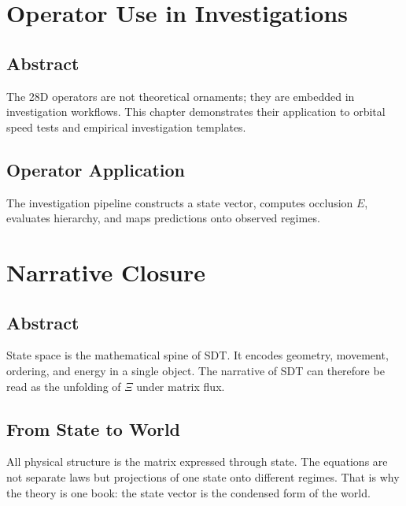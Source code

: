 \documentclass[12pt]{book}
\begin{document}
\chapter{Operator Use in Investigations}

\section*{Abstract}
The 28D operators are not theoretical ornaments; they are embedded in investigation workflows. This
chapter demonstrates their application to orbital speed tests and empirical investigation templates.

\section{Operator Application}
The investigation pipeline constructs a state vector, computes occlusion $E$, evaluates hierarchy, and
maps predictions onto observed regimes.

\chapter{Narrative Closure}

\section*{Abstract}
State space is the mathematical spine of SDT. It encodes geometry, movement, ordering, and energy in a
single object. The narrative of SDT can therefore be read as the unfolding of $\Xi$ under matrix flux.

\section{From State to World}
All physical structure is the matrix expressed through state. The equations are not separate laws but
projections of one state onto different regimes. That is why the theory is one book: the state vector is
the condensed form of the world.
\end{document}
